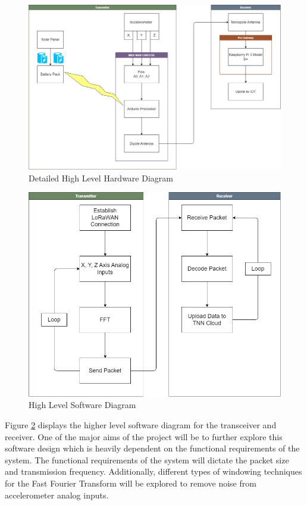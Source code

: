 \begin{figure}[h!]
\center
\includegraphics[scale=0.35]{Images/HW-Diagram-Detailed.png}
\caption{Detailed High Level Hardware Diagram}
\label{fig:HL-HW-Diagram-Detailed}
\end{figure}

\begin{figure}[h!]
\center
\includegraphics[scale=0.35]{Images/SW-Diagram.png}
\caption{High Level Software Diagram}
\label{fig:HL-SW-Diagram}
\end{figure}

Figure \ref{fig:HL-SW-Diagram} displays the higher level software diagram for the transceiver and receiver.  One of the major aims of the project will be to further explore this software design which is heavily dependent on the functional requirements of the system. The functional requirements of the system will  dictate the packet size and transmission frequency. Additionally, different types of windowing techniques for the Fast Fourier Transform will be explored to remove noise from accelerometer analog inputs. 





